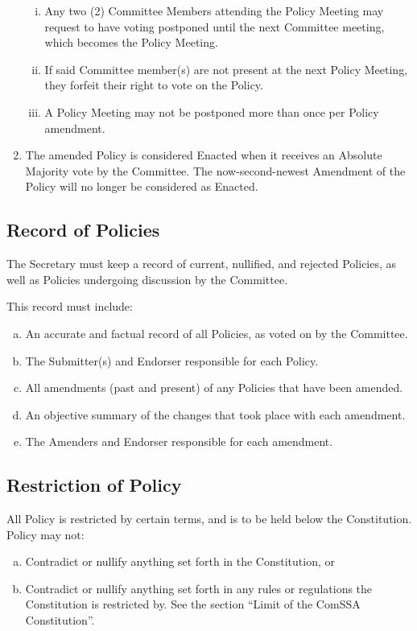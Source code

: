 \documentclass[a4paper,12pt]{article}
\begin{document}
\begin{enumerate}[1)]
\begin{enumerate}[i)]
		\item Any two (2) Committee Members attending the Policy Meeting may request to have voting postponed until the next Committee meeting, which becomes the Policy Meeting.
		\item If said Committee member(s) are not present at the next Policy Meeting, they forfeit their right to vote on the Policy.
		\item A Policy Meeting may not be postponed more than once per Policy amendment.
	\end{enumerate}
	\item The amended Policy is considered Enacted when it receives an Absolute Majority vote by the Committee. The now-second-newest Amendment of the Policy will no longer be considered as Enacted.
\end{enumerate}

\subsection{Record of Policies}

The Secretary must keep a record of current, nullified, and rejected Policies, as well as Policies undergoing discussion by the Committee.

This record must include:

\begin{enumerate}[a)]
	\item An accurate and factual record of all Policies, as voted on by the Committee.
	\item The Submitter(s) and Endorser responsible for each Policy.
	\item All amendments (past and present) of any Policies that have been amended.
	\item An objective summary of the changes that took place with each amendment.
	\item The Amenders and Endorser responsible for each amendment.
\end{enumerate}

\subsection{Restriction of Policy}

All Policy is restricted by certain terms, and is to be held below the Constitution. Policy may not:

\begin{enumerate}[a)]
	\item Contradict or nullify anything set forth in the Constitution, or
	\item Contradict or nullify anything set forth in any rules or regulations the Constitution is restricted by. See the section ``Limit of the ComSSA Constitution''.
\end{enumerate}
\end{document}
